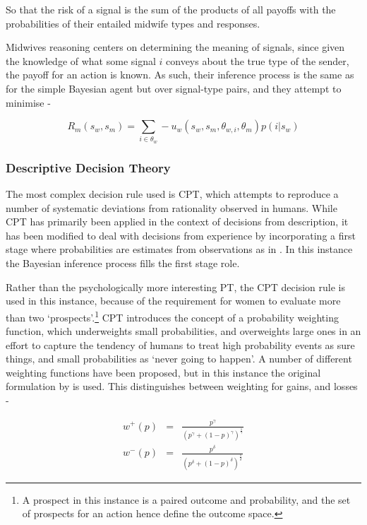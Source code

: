 So that the risk of a signal is the sum of the products of all payoffs with the probabilities of their entailed midwife types and responses.

Midwives reasoning centers on determining the meaning of signals, since given the knowledge of what some signal \(i\) conveys about the true type of the sender, the payoff for an action is known. As such, their inference process is the same as for the simple Bayesian agent but over signal-type pairs, and they attempt to minimise -

\begin{equation}
R_{m}(s_{w}, s_{m}) = \sum_{i\in \theta_{w}} -u_{w}(s_{w}, s_{m}, \theta_{w, i}, \theta_{m})p(i | s_{w})
\end{equation}

\subsubsection{Descriptive Decision Theory}

The most complex decision rule used is \ac{CPT}, which attempts to reproduce a number of systematic deviations from rationality observed in humans. While \ac{CPT} has primarily been applied in the context of decisions from description, it has been modified to deal with decisions from experience by incorporating a first stage where probabilities are estimates from observations as in \cite{FoxCPT}. In this instance the Bayesian inference process fills the first stage role.

Rather than the psychologically more interesting \ac{PT}, the \ac{CPT}
decision rule is used in this instance, because of the requirement
for women to evaluate more than two `prospects'.\footnote{A prospect in this instance is a paired outcome and probability, and the set of prospects
for an action hence define the outcome space.} \ac{CPT} introduces
the concept of a probability weighting function, which underweights
small probabilities, and overweights large ones in an effort to capture
the tendency of humans to treat high probability events as sure things,
and small probabilities as `never going to happen'. A number of different
weighting functions have been proposed, but in this instance the original
formulation by \citet{Tversky1992} is used. This distinguishes between
weighting for gains, and losses -

\begin{eqnarray*}
w^{+}(p) & = & \frac{p^{\gamma}}{(p^{\gamma}+(1-p)^{\gamma})^{\frac{1}{\gamma}}}\\
w^{-}(p) & = & \frac{p^{\delta}}{(p^{\delta}+(1-p)^{\delta})^{\frac{1}{\delta}}}
\end{eqnarray*}



